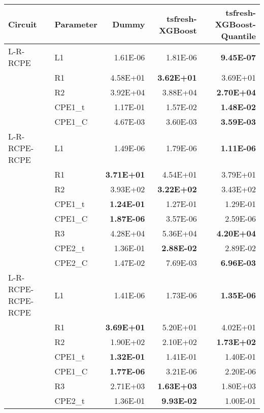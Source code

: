 \begin{tabular}{llrrr}
\toprule
            Circuit & Parameter &        Dummy &  tsfresh-XGBoost &  tsfresh-XGBoost-Quantile \\
\midrule
           L-R-RCPE  &         L1  & 1.61E-06 & 1.81E-06 & \textbf{9.45E-07}\\
                     &         R1  & 4.58E+01 & \textbf{3.62E+01} & 3.69E+01\\
                     &         R2  & 3.92E+04 & 3.88E+04 & \textbf{2.70E+04}\\
                     &     CPE1\_t  & 1.17E-01 & 1.57E-02 & \textbf{1.48E-02}\\
                     &     CPE1\_C  & 4.67E-03 & 3.60E-03 & \textbf{3.59E-03}\\
      L-R-RCPE-RCPE  &         L1  & 1.49E-06 & 1.79E-06 & \textbf{1.11E-06}\\
                     &         R1  & \textbf{3.71E+01} & 4.54E+01 & 3.79E+01\\
                     &         R2  & 3.93E+02 & \textbf{3.22E+02} & 3.43E+02\\
                     &     CPE1\_t  & \textbf{1.24E-01} & 1.27E-01 & 1.29E-01\\
                     &     CPE1\_C  & \textbf{1.87E-06} & 3.57E-06 & 2.59E-06\\
                     &         R3  & 4.28E+04 & 5.36E+04 & \textbf{4.20E+04}\\
                     &     CPE2\_t  & 1.36E-01 & \textbf{2.88E-02} & 2.89E-02\\
                     &     CPE2\_C  & 1.47E-02 & 7.69E-03 & \textbf{6.96E-03}\\
 L-R-RCPE-RCPE-RCPE  &         L1  & 1.41E-06 & 1.73E-06 & \textbf{1.35E-06}\\
                     &         R1  & \textbf{3.69E+01} & 5.20E+01 & 4.02E+01\\
                     &         R2  & 1.90E+02 & 2.10E+02 & \textbf{1.73E+02}\\
                     &     CPE1\_t  & \textbf{1.32E-01} & 1.41E-01 & 1.40E-01\\
                     &     CPE1\_C  & \textbf{1.77E-06} & 3.21E-06 & 2.20E-06\\
                     &         R3  & 2.71E+03 & \textbf{1.63E+03} & 1.80E+03\\
                     &     CPE2\_t  & 1.36E-01 & \textbf{9.93E-02} & 1.00E-01\\

\end{tabular}
